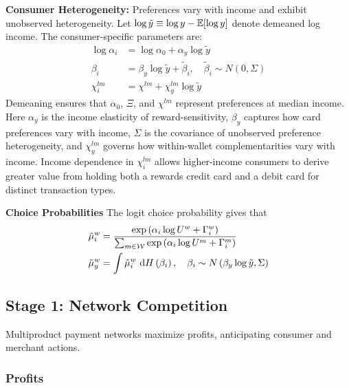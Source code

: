 \documentclass[main.tex]{subfiles}
\begin{document}
\vspace{0.1in}
\noindent \textbf{Consumer Heterogeneity:}\hspace{0.2in} Preferences vary with income and exhibit unobserved heterogeneity.
Let $\log \tilde{y} \equiv \log y - \mathbb{E}[\log y]$ denote demeaned log income.
The consumer-specific parameters are:
\begin{align}
  \log \alpha_i &= \log \alpha_0 + \alpha_y \log \tilde{y} \label{eq:alpha-income}\\
  \beta_i &= \beta_y \log \tilde{y} + \tilde{\beta}_i, \quad \tilde{\beta}_i \sim N\left(0, \Sigma\right) \label{eq:beta-income}\\
  \chi^{lm}_i &= \chi^{lm} + \chi^{lm}_y \log \tilde{y} \label{eq:chi-income}
\end{align}
Demeaning ensures that $\alpha_0$, $\Xi$, and $\chi^{lm}$ represent preferences at median income.
Here $\alpha_y$ is the income elasticity of reward-sensitivity, $\beta_y$ captures how card preferences vary with income, $\Sigma$ is the covariance of unobserved preference heterogeneity, and $\chi^{lm}_y$ governs how within-wallet complementarities vary with income.
Income dependence in $\chi^{lm}_i$ allows higher-income consumers to derive greater value from holding both a rewards credit card and a debit card for distinct transaction types.

\noindent \textbf{Choice Probabilities}\hspace{0.2in} The logit choice probability gives that
\begin{align}
  \tilde{\mu}_{i}^{w} & =\frac{\exp\left(\alpha_{i}\log U^{w}+\Gamma_{i}^{w}\right)}{\sum_{m\in\mathcal{W}}\exp\left(\alpha_{i}\log U^{m}+\Gamma_{i}^{m}\right)}\label{eq:person-market-share}\\
  \tilde{\mu}_{y}^{w} & =\int\tilde{\mu}_{i}^{w}\mbox{ d} H\left(\beta_{i}\right), \quad \beta_i \sim N\left(\beta_y \log \tilde{y}, \Sigma\right)\label{eq:income-market-share}
\end{align}

\subsection{Stage 1: Network Competition}

Multiproduct payment networks maximize profits, anticipating consumer and merchant actions.

\subsubsection{Profits}
\end{document}
